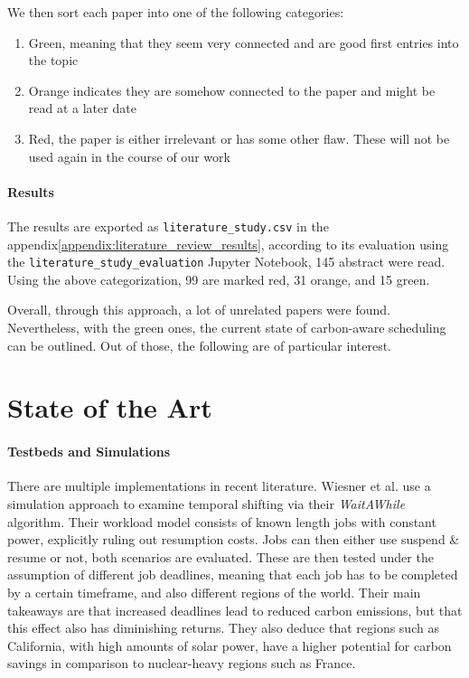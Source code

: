 We then sort each paper into one of the following categories:

\begin{enumerate}
    \item Green, meaning that they seem very connected and are good first entries into the topic
    \item Orange indicates they are somehow connected to the paper and might be read at a later date
    \item Red, the paper is either irrelevant or has some other flaw. These will not be used again in the course of our work
\end{enumerate}

\paragraph{Results}

The results are exported as \verb|literature_study.csv| in the appendix\ref{appendix:literature_review_results}, according to its evaluation using the \verb|literature_study_evaluation| Jupyter Notebook, 145 abstract were read. 
Using the above categorization, 99 are marked red, 31 orange, and 15 green.

Overall, through this approach, a lot of unrelated papers were found.
Nevertheless, with the green ones, the current state of carbon-aware scheduling can be outlined.
Out of those, the following are of particular interest.

\section{State of the Art} \label{sec:state_of_the_art}

\paragraph{Testbeds and Simulations}
There are multiple implementations in recent literature. Wiesner et al. \cite{wiesner_lets_2021} use a simulation approach to examine temporal shifting via their \emph{WaitAWhile} algorithm. Their workload model consists of known length jobs with constant power, explicitly ruling out resumption costs. 
Jobs can then either use suspend \& resume or not, both scenarios are evaluated. 
These are then tested under the assumption of different job deadlines, meaning that each job has to be completed by a certain timeframe, and also different regions of the world.
Their main takeaways are that increased deadlines lead to reduced carbon emissions, but that this effect also has diminishing returns. 
They also deduce that regions such as California, with high amounts of solar power, have a higher potential for carbon savings in comparison to nuclear-heavy regions such as France.

